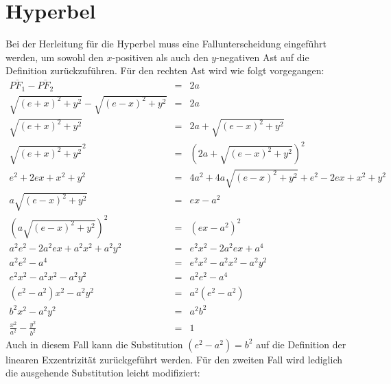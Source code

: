 \section{Hyperbel}
Bei der Herleitung für die Hyperbel muss eine Fallunterscheidung eingeführt werden, um sowohl den $x$-positiven als auch den $y$-negativen Ast auf die Definition zurückzuführen. Für den rechten Ast wird wie folgt vorgegangen:
\begin{displaymath}
	\begin{array}{rcl}
		\overline{{PF}_1} - \overline{{PF}_2} & = & 2a\\
		\sqrt{{(e+x)}^2 + y^2} - \sqrt{{(e-x)}^2 + y^2} & = & 2a\\
		\sqrt{{(e+x)}^2 + y^2} & = & 2a + \sqrt{{(e-x)}^2 + y^2}\\
		\sqrt{{(e+x)}^2 + y^2}^2 & = & \left (2a + \sqrt{{(e-x)}^2 + y^2}\right )^2\\
		e^2 + 2ex + x^2 + y^2 & = & 4a^2 + 4a \sqrt{(e-x)^2+y^2} + e^2 - 2ex + x^2 + y^2\\
		a\sqrt{{(e-x)}^2 + y^2} & = & ex - a^2\\
		\left (a\sqrt{{(e-x)}^2 + y^2}\right )^2 & = & (ex - a^2)^2\\
		a^2e^2 - 2a^2ex + a^2x^2 + a^2y^2 &=& e^2x^2 - 2a^2ex + a^4\\
		a^2e^2 - a^4 &=& e^2x^2 - a^2x^2 - a^2y^2\\
		e^2x^2 - a^2x^2 - a^2y^2 &=& a^2e^2 - a^4\\
		\left(e^2 - a^2\right)x^2 - a^2y^2 &=& a^2\left(e^2 - a^2\right)\\
		b^2x^2 - a^2y^2 &=& a^2b^2\\
		\frac{x^2}{a^2} - \frac{y^2}{b^2} &=& 1
	\end{array}
\end{displaymath}
Auch in diesem Fall kann die Substitution $\left(e^2 - a^2\right) = b^2$ auf die Definition der linearen Exzentrizität zurückgeführt werden. Für den zweiten Fall wird lediglich die ausgehende Substitution leicht modifiziert:
